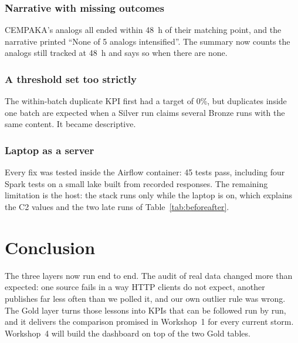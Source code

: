 \documentclass[10pt,twocolumn,letterpaper]{article}
\begin{document}
\subsubsection{Narrative with missing outcomes} CEMPAKA's analogs all ended within 48~h of their matching point, and the narrative printed ``None of 5 analogs intensified''. The summary now counts the analogs still tracked at 48~h and says so when there are none.

\subsubsection{A threshold set too strictly} The within-batch duplicate KPI first had a target of 0\%, but duplicates inside one batch are expected when a Silver run claims several Bronze runs with the same content. It became descriptive.

\subsubsection{Laptop as a server} Every fix was tested inside the Airflow container: 45 tests pass, including four Spark tests on a small lake built from recorded responses. The remaining limitation is the host: the stack runs only while the laptop is on, which explains the C2 values and the two late runs of Table~\ref{tab:beforeafter}.

\section{Conclusion}
The three layers now run end to end. The audit of real data changed more than expected: one source fails in a way HTTP clients do not expect, another publishes far less often than we polled it, and our own outlier rule was wrong. The Gold layer turns those lessons into KPIs that can be followed run by run, and it delivers the comparison promised in Workshop~1 for every current storm. Workshop~4 will build the dashboard on top of the two Gold tables.
\end{document}
